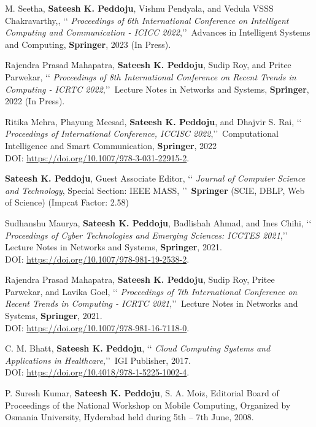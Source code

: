 \begin{etaremune}
	\item%
M. Seetha, \textbf{Sateesh K. Peddoju}, Vishnu Pendyala, and Vedula VSSS Chakravarthy,, \lq\lq
\emph{Proceedings of 6th International Conference on Intelligent Computing and Communication - ICICC 2022},\rq\rq\, Advances in Intelligent Systems and Computing, \textbf{Springer}, 2023 (In Press).

	\item%
Rajendra Prasad Mahapatra, \textbf{Sateesh K. Peddoju}, Sudip Roy, and Pritee Parwekar, \lq\lq
\emph{Proceedings of 8th International Conference on Recent Trends in Computing - ICRTC 2022},\rq\rq\, Lecture Notes in Networks and Systems, \textbf{Springer}, 2022 (In Press).

	\item%
Ritika Mehra, Phayung Meesad, \textbf{Sateesh K. Peddoju}, and Dhajvir S. Rai, \lq\lq
\emph{Proceedings of International Conference, ICCISC 2022},\rq\rq\, Computational Intelligence and Smart Communication, \textbf{Springer}, 2022 \\DOI: \url{https://doi.org/10.1007/978-3-031-22915-2}.
		
		\item%
\textbf{Sateesh K. Peddoju}, Guest Associate Editor, \lq\lq
\emph{Journal of Computer Science and Technology}, Special Section: IEEE MASS, \rq\rq\, \textbf{Springer} (SCIE, DBLP, Web of Science) (Impcat Factor: 2.58)

	\item%
Sudhanshu Maurya, \textbf{Sateesh K. Peddoju}, 
 Badlishah Ahmad, and Ines Chihi, \lq\lq
\emph{Proceedings of Cyber Technologies and Emerging Sciences: ICCTES 2021},\rq\rq\, Lecture Notes in Networks and Systems, \textbf{Springer}, 2021. \\DOI: \url{https://doi.org/10.1007/978-981-19-2538-2}.

	\item%
Rajendra Prasad Mahapatra, \textbf{Sateesh K. Peddoju}, Sudip Roy, Pritee Parwekar, and Lavika Goel, \lq\lq
\emph{Proceedings of 7th International Conference on Recent Trends in Computing - ICRTC 2021},\rq\rq\, Lecture Notes in Networks and Systems, \textbf{Springer}, 2021. \\DOI: \url{https://doi.org/10.1007/978-981-16-7118-0}.
	
	\item%
C. M. Bhatt, \textbf{Sateesh K. Peddoju}, \lq\lq
\emph{Cloud Computing Systems and Applications in Healthcare},\rq\rq\, IGI Publisher, 2017. \\DOI: \url{https://doi.org/10.4018/978-1-5225-1002-4}.

\item%
P. Suresh Kumar, \textbf{Sateesh K. Peddoju}, S. A. Moiz, Editorial Board of Proceedings of the National Workshop on Mobile Computing, Organized by Osmania University, Hyderabad held during 5th – 7th June, 2008.

\end{etaremune}

